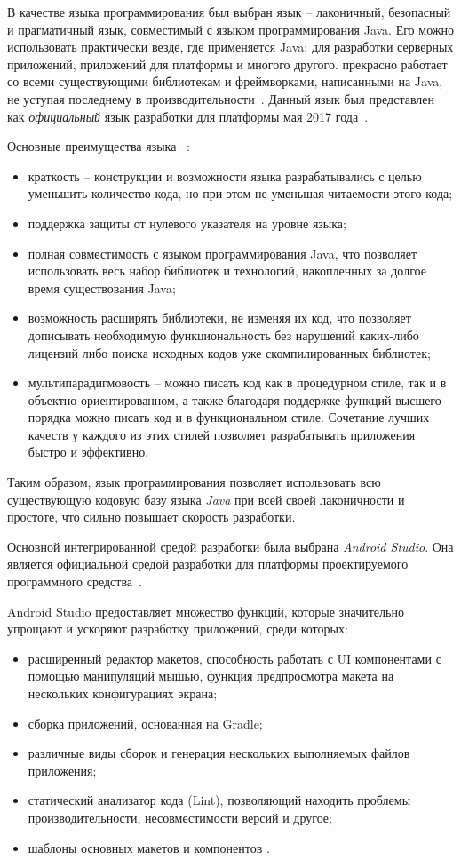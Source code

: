 В качестве языка программирования был выбран язык \emph{\kt} -- лаконичный, безопасный и прагматичный язык, совместимый с языком программирования Java.
Его можно использовать практически везде, где применяется Java: для разработки серверных приложений, приложений для платформы \andro и многого другого.
\kt прекрасно работает со всеми существующими библиотекам и фреймворками, написанными на Java, не уступая последнему в производительности~\cite{kotlin_in_action}.
Данный язык был представлен как \emph{официальный} язык разработки для платформы  мая 2017 года~\cite{kotlin_and_android}.

Основные преимущества языка \kt~\cite{kotlin_doc}:
\begin{itemize}
  \item краткость -- конструкции и возможности языка разрабатывались с целью уменьшить 
  количество кода, но при этом не уменьшая читаемости этого кода;
  \item поддержка защиты от нулевого указателя на уровне языка;
  \item полная совместимость с языком программирования Java, что позволяет использовать
  весь набор библиотек и технологий, накопленных за долгое время существования Java;
  \item возможность расширять библиотеки, не изменяя их код, что позволяет дописывать необходимую 
  функциональность без нарушений каких-либо лицензий либо поиска исходных кодов уже 
  скомпилированных библиотек;
  \item мультипарадигмовость -- \kt можно писать код как в процедурном стиле, так и в 
  объектно-ориентированном, а также благодаря поддержке функций высшего порядка можно 
  писать код и в функциональном стиле. Сочетание лучших качеств у каждого из этих стилей 
  позволяет разрабатывать приложения быстро и эффективно.
\end{itemize}

Таким образом, язык программирования \kt позволяет использовать всю существующую кодовую базу языка \emph{Java} при всей своей лаконичности и простоте, что сильно повышает скорость разработки.

Основной интегрированной средой разработки была выбрана \emph{Android Studio}. Она является официальной средой разработки для платформы проектируемого программного средства~\cite{android_studio}. 

Android Studio предоставляет множество функций, которые значительно упрощают и ускоряют разработку приложений, среди которых:
\begin{itemize}
    \item расширенный редактор макетов, способность работать с UI компонентами с помощью манипуляций мышью, функция предпросмотра макета на нескольких конфигурациях экрана;
    \item сборка приложений, основанная на Gradle;
    \item различные виды сборок и генерация нескольких выполняемых файлов приложения;
    \item статический анализатор кода (Lint), позволяющий находить проблемы производительности, несовместимости версий и другое;
    \item шаблоны основных макетов и компонентов \andro.
\end{itemize}